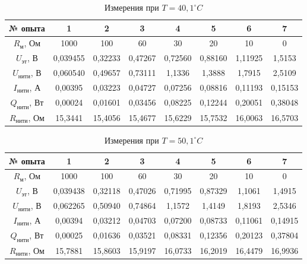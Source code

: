 \documentclass[a4paper,14pt]{article}
\begin{document}
\begin{table}[H]
\caption{Измерения при $T = 40,1^{\circ}C$}
\label{   }
\begin{tabular}{|c|c|c|c|c|c|c|c|}
\hline
№ опыта    & 1        & 2       & 3       & 4       & 5       & 6       & 7       \\ \hline
$R_{\text{м}}$, Ом    & 1000     & 100     & 60      & 30      & 20      & 10      & 0       \\ \hline
$U_{\text{эт}}$, В     & 0,039455 & 0,32233 & 0,47267 & 0,72560 & 0,88160 & 1,11925 & 1,5153  \\ \hline
$U_{\text{нити}}$, В   & 0,060540 & 0,49657 & 0,73111 & 1,1336  & 1,3888  & 1,7915  & 2,5109  \\ \hline
$I_{\text{нити}}$, А   & 0,00395  & 0,03223 & 0,04727 & 0,07256 & 0,08816 & 0,11193 & 0,15153 \\ \hline
$Q_{\text{нити}}$, Вт  & 0,00024  & 0,01601 & 0,03456 & 0,08225 & 0,12244 & 0,20051 & 0,38048 \\ \hline
$R_{\text{нити}}$, Ом & 15,3441  & 15,4056 & 15,4677 & 15,6229 & 15,7532 & 16,0063 & 16,5703 \\ \hline
\end{tabular}
\end{table}

\begin{table}[H]
\caption{Измерения при $T = 50,1^{\circ}C$}
\label{   }
\begin{tabular}{|c|c|c|c|c|c|c|c|}
\hline
№ опыта    & 1        & 2       & 3       & 4       & 5       & 6       & 7       \\ \hline
$R_{\text{м}}$, Ом    & 1000     & 100     & 60      & 30      & 20      & 10      & 0       \\ \hline
$U_{\text{эт}}$, В     & 0,039438 & 0,32118 & 0,47026 & 0,71995 & 0,87329 & 1,1061  & 1,4915  \\ \hline
$U_{\text{нити}}$, В   & 0,062265 & 0,50940 & 0,74864 & 1,1572  & 1,4149  & 1,8193  & 2,5346  \\ \hline
$I_{\text{нити}}$, А   & 0,00394  & 0,03212 & 0,04703 & 0,07200 & 0,08733 & 0,11061 & 0,14915 \\ \hline
$Q_{\text{нити}}$, Вт  & 0,00025  & 0,01636 & 0,03521 & 0,08331 & 0,12356 & 0,20123 & 0,37804 \\ \hline
$R_{\text{нити}}$, Ом & 15,7881  & 15,8603 & 15,9197 & 16,0733 & 16,2019 & 16,4479 & 16,9936 \\ \hline
\end{tabular}
\end{table}
\end{document}

